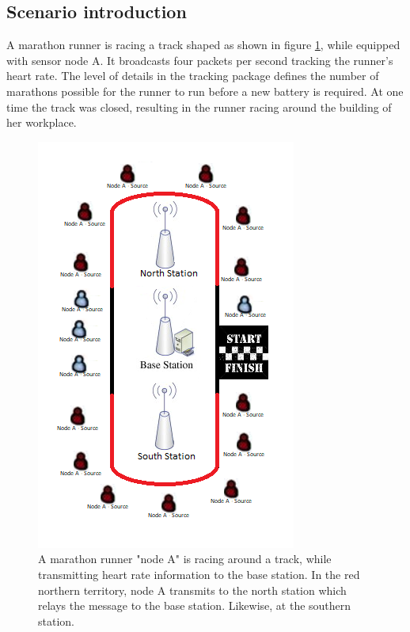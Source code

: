 \subsection{Scenario introduction}\label{sc:scenarioIntroduction}
A marathon runner is racing a track shaped as shown in figure \ref{fig:scenarioIntroduction}, while equipped with sensor node A. It broadcasts four packets per second tracking the runner's heart rate. The level of details in the tracking package defines the number of marathons possible for the runner to run before a new battery is required. At one time the track was closed, resulting in the runner racing around the building of her workplace.

\begin{figure}[h]
	\centering
	\includegraphics[width=\linewidth]{introduction/scenario/fig/scenarioIntroduction.png}
	\caption{A marathon runner "node A" is racing around a track, while transmitting heart rate information to the base station. In the red northern territory, node A transmits to the north station which relays the message to the base station. Likewise, at the southern station.}
	\label{fig:scenarioIntroduction}
\end{figure}

